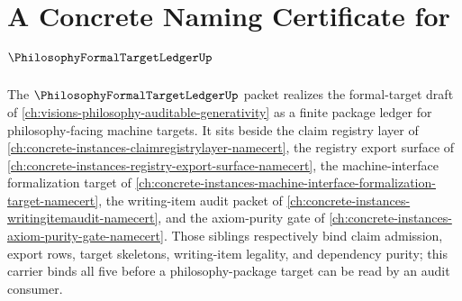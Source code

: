 \chapter{A Concrete Naming Certificate for $\PhilosophyFormalTargetLedgerUp$}
\label{ch:concrete-instances-philosophy-formal-target-ledger-namecert}

The $\PhilosophyFormalTargetLedgerUp$ packet realizes the formal-target draft of \autoref{ch:visions-philosophy-auditable-generativity} as a finite package ledger for philosophy-facing machine targets. It sits beside the claim registry layer of \autoref{ch:concrete-instances-claimregistrylayer-namecert}, the registry export surface of \autoref{ch:concrete-instances-registry-export-surface-namecert}, the machine-interface formalization target of \autoref{ch:concrete-instances-machine-interface-formalization-target-namecert}, the writing-item audit packet of \autoref{ch:concrete-instances-writingitemaudit-namecert}, and the axiom-purity gate of \autoref{ch:concrete-instances-axiom-purity-gate-namecert}. Those siblings respectively bind claim admission, export rows, target skeletons, writing-item legality, and dependency purity; this carrier binds all five before a philosophy-package target can be read by an audit consumer.

